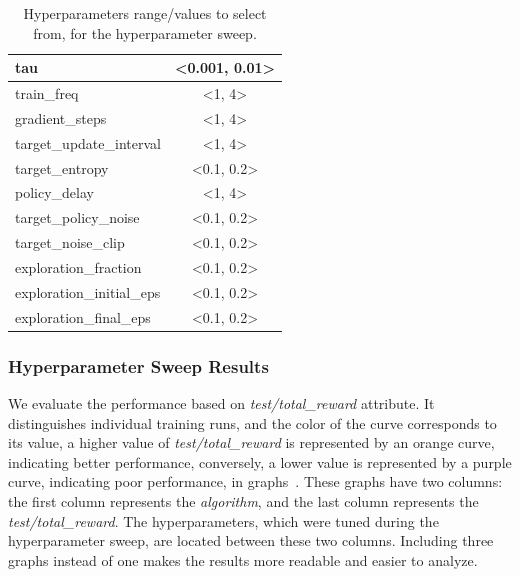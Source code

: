 \documentclass[../xlapes02]{subfiles}
\begin{document}
\begin{table}[!ht]
{\begin{tabular}{|l|c|}
                tau                       & <0.001, 0.01>                                   \\ \hline
                train\_freq               & <1, 4>                                          \\ \hline
                gradient\_steps           & <1, 4>                                          \\ \hline
                target\_update\_interval  & <1, 4>                                          \\ \hline
                target\_entropy           & <0.1, 0.2>                                      \\ \hline
                policy\_delay             & <1, 4>                                          \\ \hline
                target\_policy\_noise     & <0.1, 0.2>                                      \\ \hline
                target\_noise\_clip       & <0.1, 0.2>                                      \\ \hline
                exploration\_fraction     & <0.1, 0.2>                                      \\ \hline
                exploration\_initial\_eps & <0.1, 0.2>                                      \\ \hline
                exploration\_final\_eps   & <0.1, 0.2>                                      \\ \hline
            \end{tabular}
        }
        \caption{Hyperparameters range/values to select from, for the hyperparameter sweep.}
        \label{tab:hyperparameters}
    \end{table}

    \subsubsection{Hyperparameter Sweep Results}\label{subsubsec:hyperparameter_sweep_results}
    We evaluate the performance based on \emph{test/total\_reward} attribute. It distinguishes individual training runs, and the color of the curve corresponds to its value, a higher value of \emph{test/total\_reward} is represented by an \textcolor[RGB]{255,128,0}{orange curve, indicating better performance}, conversely, a lower value is represented by a \textcolor[RGB]{100,0,200}{purple curve, indicating poor performance}, in graphs~. These graphs have two columns: the first column represents the \emph{algorithm}, and the last column represents the \emph{test/total\_reward}. The hyperparameters, which were tuned during the hyperparameter sweep, are located between these two columns. Including three graphs instead of one makes the results more readable and easier to analyze.
\end{document}
